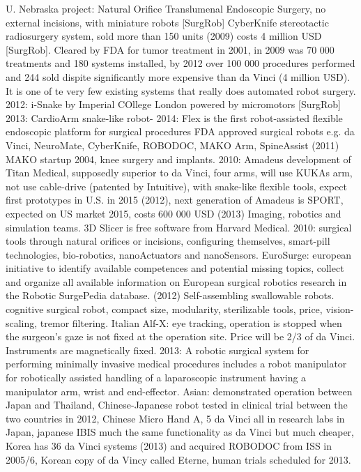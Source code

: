 U. Nebraska project: Natural Orifice Translumenal Endoscopic Surgery, no external incisions, with miniature robots [SurgRob]
CyberKnife stereotactic radiosurgery system, sold more than 150 units (2009) costs 4 million USD [SurgRob]. Cleared by FDA for tumor treatment in 2001, in 2009 was 70 000 treatments and 180 systems installed, by 2012 over 100 000 procedures performed and 244 sold dispite significantly more expensive than da Vinci (4 million USD). It is one of te very few existing systems that really does automated robot surgery.
2012: i-Snake by Imperial COllege London powered by micromotors [SurgRob]
2013: CardioArm snake-like robot-
2014: Flex is the first robot-assisted flexible endoscopic platform for surgical procedures
FDA approved surgical robots e.g. da Vinci, NeuroMate, CyberKnife, ROBODOC, MAKO Arm, SpineAssist (2011)
MAKO startup 2004, knee surgery and implants.
2010: Amadeus development of Titan Medical, supposedly superior to da Vinci, four arms, will use KUKAs arm, not use cable-drive (patented by Intuitive), with snake-like flexible tools, expect first prototypes in U.S. in 2015 (2012), next generation of Amadeus is SPORT, expected on US market 2015, costs 600 000 USD (2013)
Imaging, robotics and simulation teams.
3D Slicer is free software from Harvard Medical.
2010: surgical tools through natural orifices or incisions, configuring themselves, smart-pill technologies, bio-robotics, nanoActuators and nanoSensors.
EuroSurge: european initiative to identify available competences and potential missing topics, collect and organize all available information on European surgical robotics research in the Robotic SurgePedia database. (2012)
Self-assembling swallowable robots.
cognitive surgical robot, compact size, modularity, sterilizable tools, price, vision-scaling, tremor filtering.
Italian Alf-X: eye tracking, operation is stopped when the surgeon's gaze is not fixed at the operation site. Price will be 2/3 of da Vinci. Instruments are magnetically fixed.
2013: A robotic surgical system for performing minimally invasive medical procedures includes a robot manipulator for robotically assisted handling of a laparoscopic instrument having a manipulator arm, wrist and end-effector.
Asian: demonstrated operation between Japan and Thailand, Chinese-Japanese robot tested in clinical trial between the two countries in 2012, Chinese Micro Hand A, 5 da Vinci all in research labs in Japan, japanese IBIS much the same functionality as da Vinci but much cheaper, Korea has 36 da Vinci systems (2013) and acquired ROBODOC from ISS in 2005/6, Korean copy of da Vincy called Eterne, human trials scheduled for 2013.
